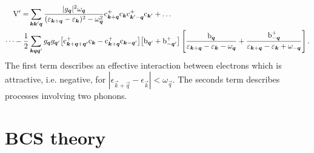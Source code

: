 \begin{align*}
    \mathrm V' = &\sum_{\boldsymbol k \boldsymbol k' \boldsymbol q}
    \frac {|g_{\boldsymbol q}|^2 \omega_{\boldsymbol q}}
    {(\varepsilon_{\boldsymbol k + \boldsymbol q} - \varepsilon_{\boldsymbol k})^2 - \omega_{\boldsymbol q}^2}
    \mathrm c_{\boldsymbol k  + \boldsymbol q}^+ \mathrm c_{\boldsymbol k }
    \mathrm c_{\boldsymbol k' - \boldsymbol q}^+ \mathrm c_{\boldsymbol k'} + \dots
    \\
    \dots - \frac 1 2 &\sum_{\boldsymbol k \boldsymbol q \boldsymbol q'} g_{\boldsymbol q} g_{\boldsymbol q'}
    \big[ \mathrm c_{\boldsymbol k + \boldsymbol q + \boldsymbol q'}^+ \mathrm c_{\boldsymbol k}
    - \mathrm c_{\boldsymbol k + \boldsymbol q}^+ \mathrm c_{\boldsymbol k - \boldsymbol q'} \big]
    \big[ \mathrm b_{\boldsymbol q'} + \mathrm b_{-\boldsymbol q'}^+ \big] \left[
        \frac {\mathrm b_{\boldsymbol q}}
        {\varepsilon_{\boldsymbol k + \boldsymbol q} - \varepsilon_{\boldsymbol k} - \omega_{\boldsymbol q}}
        + \frac {\mathrm b_{-\boldsymbol q}^+}
        {\varepsilon_{\boldsymbol k + \boldsymbol q} - \varepsilon_{\boldsymbol k} + \omega_{-\boldsymbol q}}
    \right].
\end{align*}
%
The first term describes an effective interaction between electrons which is
attractive, i.e. negative, for $|\epsilon_{\vec k + \vec q} - \epsilon_{\vec k}|
< \omega_{\vec q}$. The seconds term describes processes involving two phonons.

\section{BCS theory}

